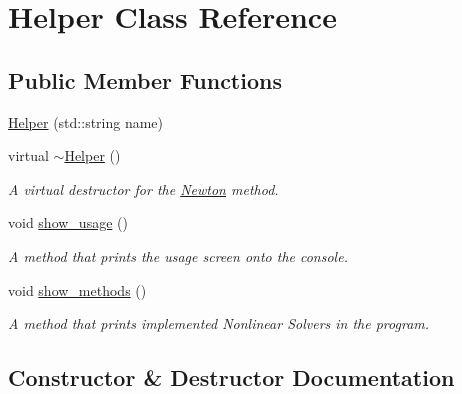 \hypertarget{class_helper}{}\section{Helper Class Reference}
\label{class_helper}
\subsection*{Public Member Functions}
\begin{DoxyCompactItemize}
\item 
\hyperlink{class_helper_a900451b12f8e4c9ff5b17625446a245a}{Helper} (std\+::string name)
\item 
virtual \hyperlink{class_helper_ad714e92b4bc40bee681e0713503c9b27}{$\sim$\+Helper} ()\hypertarget{class_helper_ad714e92b4bc40bee681e0713503c9b27}{}\label{class_helper_ad714e92b4bc40bee681e0713503c9b27}

\begin{DoxyCompactList}\small\item\em A virtual destructor for the \hyperlink{class_newton}{Newton} method. \end{DoxyCompactList}\item 
void \hyperlink{class_helper_abbd7f229f433e467b7d8e1562c89e391}{show\+\_\+usage} ()\hypertarget{class_helper_abbd7f229f433e467b7d8e1562c89e391}{}\label{class_helper_abbd7f229f433e467b7d8e1562c89e391}

\begin{DoxyCompactList}\small\item\em A method that prints the usage screen onto the console. \end{DoxyCompactList}\item 
void \hyperlink{class_helper_aa560259807192d3feac483e88894bc64}{show\+\_\+methods} ()\hypertarget{class_helper_aa560259807192d3feac483e88894bc64}{}\label{class_helper_aa560259807192d3feac483e88894bc64}

\begin{DoxyCompactList}\small\item\em A method that prints implemented Nonlinear Solvers in the program. \end{DoxyCompactList}\end{DoxyCompactItemize}


\subsection{Constructor \& Destructor Documentation}
